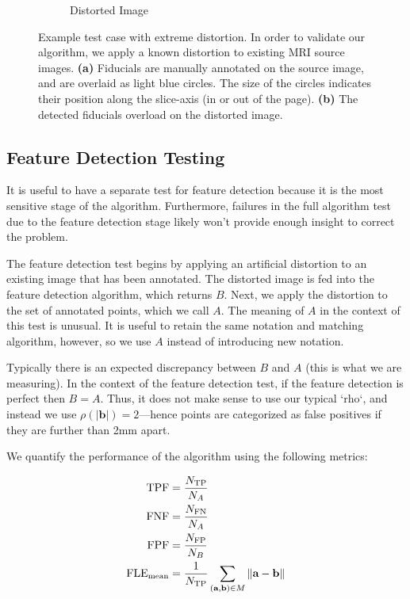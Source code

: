 \documentclass[12pt]{article}
\begin{document}
\begin{figure}
\begin{subfigure}[b]{0.48\textwidth}
        \caption{Distorted Image}
        \label{fig:test-case_2}
    \end{subfigure}
    \caption{Example test case with extreme distortion.  In order to validate our algorithm, we apply a known distortion to existing MRI source images. \textbf{(a)} Fiducials are manually annotated on the source image, and are overlaid as light blue circles.  The size of the circles indicates their position along the slice-axis (in or out of the page).  \textbf{(b)} The detected fiducials overload on the distorted image.}
    \label{fig:test-case}
\end{figure}

\subsection{Feature Detection Testing}

It is useful to have a separate test for feature detection because it is the most sensitive stage of the algorithm.  Furthermore, failures in the full algorithm test due to the feature detection stage likely won't provide enough insight to correct the problem.

The feature detection test begins by applying an artificial distortion to an existing image that has been annotated.  The distorted image is fed into the feature detection algorithm, which returns $B$.  Next, we apply the distortion to the set of annotated points, which we call $A$.  The meaning of $A$ in the context of this test is unusual.  It is useful to retain the same notation and matching algorithm, however, so we use $A$ instead of introducing new notation.

Typically there is an expected discrepancy between $B$ and $A$ (this is what we are measuring).  In the context of the feature detection test, if the feature detection is perfect then $B = A$.  Thus, it does not make sense to use our typical `rho`, and instead we use $\rho(|\mathbf{b}|) = 2$---hence points are categorized as false positives if they are further than 2mm apart.  

We quantify the performance of the algorithm using the following metrics: 

$$
\begin{align*}
    \textrm{TPF} &= \frac{N_\textrm{TP}}{N_A} \\
    \textrm{FNF} &= \frac{N_\textrm{FN}}{N_A} \\
    \textrm{FPF} &= \frac{N_\textrm{FP}}{N_B} \\
    \textrm{FLE}_\textrm{mean} &= \frac{1}{N_\textrm{TP}} \sum_{(\textbf{a}, \textbf{b}) \in M} \| \textbf{a} - \textbf{b} \|\\
\end{align*} \\
$$
\end{document}
